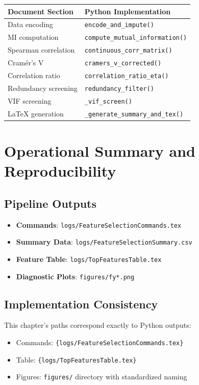 \begin{center}
\begin{tabular}{|l|l|}
\hline
\textbf{Document Section} & \textbf{Python Implementation} \\
\hline
Data encoding & \texttt{encode\_and\_impute()} \\
\hline
MI computation & \texttt{compute\_mutual\_information()} \\
\hline
Spearman correlation & \texttt{continuous\_corr\_matrix()} \\
\hline
Cramér's V & \texttt{cramers\_v\_corrected()} \\
\hline
Correlation ratio & \texttt{correlation\_ratio\_eta()} \\
\hline
Redundancy screening & \texttt{redundancy\_filter()} \\
\hline
VIF screening & \texttt{\_vif\_screen()} \\
\hline
LaTeX generation & \texttt{\_generate\_summary\_and\_tex()} \\
\hline
\end{tabular}
\end{center}

\section{Operational Summary and Reproducibility}

\subsection{Pipeline Outputs}

\begin{itemize}
    \item \textbf{Commands}: \texttt{logs/FeatureSelectionCommands.tex}
    \item \textbf{Summary Data}: \texttt{logs/FeatureSelectionSummary.csv}
    \item \textbf{Feature Table}: \texttt{logs/TopFeaturesTable.tex}
    \item \textbf{Diagnostic Plots}: \texttt{figures/fy*.png}
\end{itemize}

\subsection{Implementation Consistency}

This chapter's paths correspond exactly to Python outputs:
\begin{itemize}
    \item Commands: \texttt{\string\{logs/FeatureSelectionCommands.tex\}}
    \item Table: \texttt{\string\{logs/TopFeaturesTable.tex\}}
    \item Figures: \texttt{figures/} directory with standardized naming
\end{itemize}

